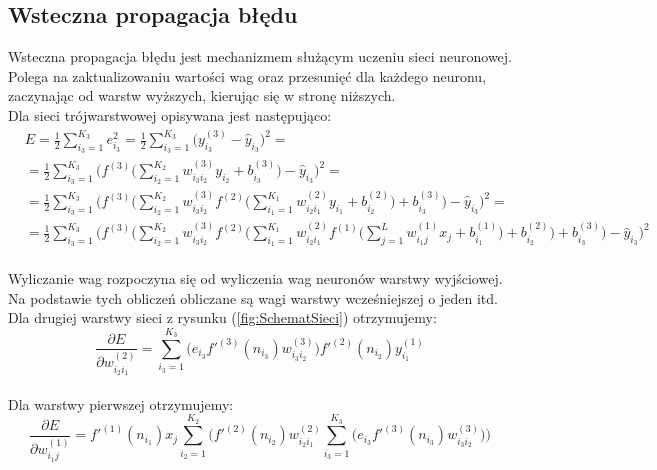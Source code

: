 \documentclass[a4paper, openright, twoside,11pt]{article}
\begin{document}
    \clearpage
    \subsection{Wsteczna propagacja błędu}
    Wsteczna propagacja błędu jest mechanizmem służącym uczeniu sieci neuronowej. Polega na zaktualizowaniu wartości wag oraz przesunięć dla każdego neuronu, zaczynając od warstw wyższych, kierując się w stronę niższych.\\
    Dla sieci trójwarstwowej opisywana jest następująco:
    \\[0.2cm]
\begin{equation}
\begin{aligned}
    &E = \frac{1}{2} \sum_{i_{3}=1}^{K_3}e^{2}_{i_3} = \frac{1}{2}  \sum_{i_{3}=1}^{K_3}
    \Big(y^{(3)}_{i_3}-\hat y_{i_3}
    \Big)^{2} = \\
    &=\frac{1}{2}  \sum_{i_{3}=1}^{K_3}
    \Bigg( f^{(3)} 
    \Bigg(  \sum_{i_{2}=1}^{K_2}w^{(3)}_{i_3 i_2}y_{i_2}+b^{(3)}_{i_3}
    \Bigg)  -\hat y_{i_3}
    \Bigg)^{2} = \\
    &=\frac{1}{2}  \sum_{i_{3}=1}^{K_3}
    \Bigg( f^{(3)} 
    \Bigg( \sum_{i_{2}=1}^{K_2}w^{(3)}_{i_3 i_2} f^{(2)} 
    \Bigg( \sum_{i_{1}=1}^{K_1}w^{(2)}_{i_2 i_1} y_{i_1}+b^{(2)}_{i_2}
    \Bigg) +b^{(3)}_{i_3} 
    \Bigg) -\hat y_{i_3}
    \Bigg)^{2} = \\
    &=\frac{1}{2}  \sum_{i_{3}=1}^{K_3}
    \Bigg( f^{(3)} 
    \Bigg( \sum_{i_{2}=1}^{K_2}w^{(3)}_{i_3 i_2} f^{(2)}
    \Bigg( \sum_{i_{1}=1}^{K_1}w^{(2)}_{i_2 i_1} f^{(1)}
    \Bigg( \sum_{j=1}^{L}w^{(1)}_{i_1 j}x_{j} + b^{(1)}_{i_1}
    \Bigg) +b^{(2)}_{i_2}
    \Bigg) +b^{(3)}_{i_3} 
    \Bigg) -\hat y_{i_3}
    \Bigg)^{2}
\end{aligned}
\end{equation}\\

    Wyliczanie wag rozpoczyna się od wyliczenia wag neuronów warstwy wyjściowej. Na podstawie tych obliczeń obliczane są wagi warstwy wcześniejszej o jeden itd.\\[0.5cm]
    Dla drugiej warstwy sieci z rysunku (\ref{fig:SchematSieci}) otrzymujemy:\\[0.2cm]
    \begin{equation}
    \frac{\partial E}{\partial w^{(2)}_{i_2i_1}} = \sum_{i_{3}=1}^{K_3}\Big(e_{i_3} f'^{(3)}(n_{i_3}) w^{(3)}_{i_3 i_2}\Big)
    f'^{(2)}(n_{i_2}) y^{(1)}_{i_1}
    \end{equation}\\[0.2cm]
    Dla warstwy pierwszej otrzymujemy:\\[0.2cm]
    \begin{equation}
     \frac{\partial E}{\partial w^{(1)}_{i_1j}} = f'^{(1)}(n_{i_1}) x_j 
    \sum_{i_{2}=1}^{K_2}\Bigg( f'^{(2)}(n_{i_2}) w^{(2)}_{i_2 i_1}
     \sum_{i_{3}=1}^{K_3}\bigg(e_{i_3} f'^{(3)}(n_{i_3}) w^{(3)}_{i_3 i_2}   \bigg)\Bigg)
    \end{equation}
\end{document}
